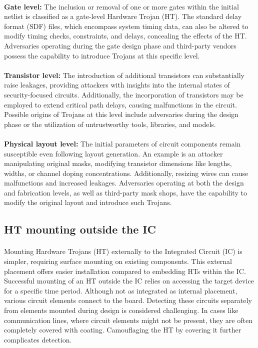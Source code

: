 \paragraph*{}
\textbf{Gate level:} The inclusion or removal of one or more gates within the initial netlist is classified as a gate-level Hardware Trojan (HT). The standard delay format (SDF) files, which encompass system timing data, can also be altered to modify timing checks, constraints, and delays, concealing the effects of the HT. Adversaries operating during the gate design phase and third-party vendors possess the capability to introduce Trojans at this specific level.
\paragraph*{}
\textbf{Transistor level:} The introduction of additional transistors can substantially raise leakages, providing attackers with insights into the internal states of security-focused circuits. Additionally, the incorporation of transistors may be employed to extend critical path delays, causing malfunctions in the circuit. Possible origins of Trojans at this level include adversaries during the design phase or the utilization of untrustworthy tools, libraries, and models.
\paragraph*{}
\textbf{Physical layout level:} The initial parameters of circuit components remain susceptible even following layout generation. An example is an attacker manipulating original masks, modifying transistor dimensions like lengths, widths, or channel doping concentrations. Additionally, resizing wires can cause malfunctions and increased leakages. Adversaries operating at both the design and fabrication levels, as well as third-party mask shops, have the capability to modify the original layout and introduce such Trojans.
\subsection{HT mounting outside the IC}
\paragraph*{}
Mounting Hardware Trojans (HT) externally to the Integrated Circuit (IC) is simpler, requiring surface mounting on existing components. This external placement offers easier installation compared to embedding HTs within the IC. Successful mounting of an HT outside the IC relies on accessing the target device for a specific time period. Although not as integrated as internal placement, various circuit elements connect to the board. Detecting these circuits separately from elements mounted during design is considered challenging. In cases like communication lines, where circuit elements might not be present, they are often completely covered with coating. Camouflaging the HT by covering it further complicates detection.

